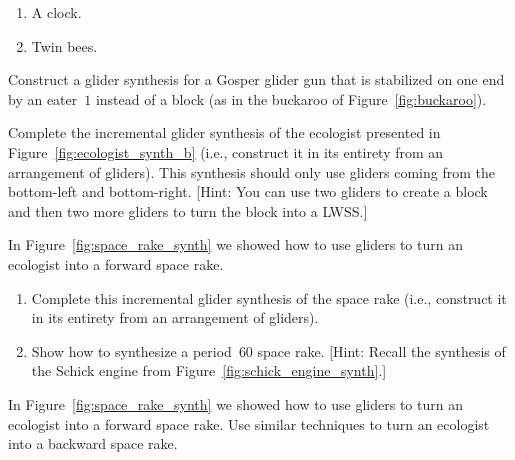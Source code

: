 \begin{multicols}{2}
\begin{problem}
\begin{enumerate}[label=(\alph*)]
		\item A clock.
		
		\item Twin bees.
	\end{enumerate}
\end{problem}


\mfilbreak


\begin{problem}\label{exer:ggg_stabilized_by_eater_synthesis}
	Construct a glider synthesis for a Gosper glider gun that is stabilized on one end by an eater~$1$ instead of a block (as in the buckaroo of Figure~\ref{fig:buckaroo}).
\end{problem}


\mfilbreak


\begin{problem}\label{exer:ecologist_synth}
	Complete the incremental glider synthesis of the ecologist presented in Figure~\ref{fig:ecologist_synth_b} (i.e., construct it in its entirety from an arrangement of gliders). This synthesis should only use gliders coming from the bottom-left and bottom-right. [Hint: You can use two gliders to create a block and then two more gliders to turn the block into a LWSS.]
\end{problem}


\mfilbreak


\begin{problem}\label{exer:make_space_rake_synth}
	In Figure~\ref{fig:space_rake_synth} we showed how to use gliders to turn an ecologist into a forward space rake.
	\begin{enumerate}[label=(\alph*)]
		\item Complete this incremental glider synthesis of the space rake (i.e., construct it in its entirety from an arrangement of gliders).
		
		\item Show how to synthesize a period~$60$ space rake. [Hint: Recall the synthesis of the Schick engine from Figure~\ref{fig:schick_engine_synth}.]
	\end{enumerate}
\end{problem}


\mfilbreak


\begin{problem}\label{exer:space_rake_synth}
	In Figure~\ref{fig:space_rake_synth} we showed how to use gliders to turn an ecologist into a forward space rake. Use similar techniques to turn an ecologist into a backward space rake.
\end{problem}



\end{multicols}

